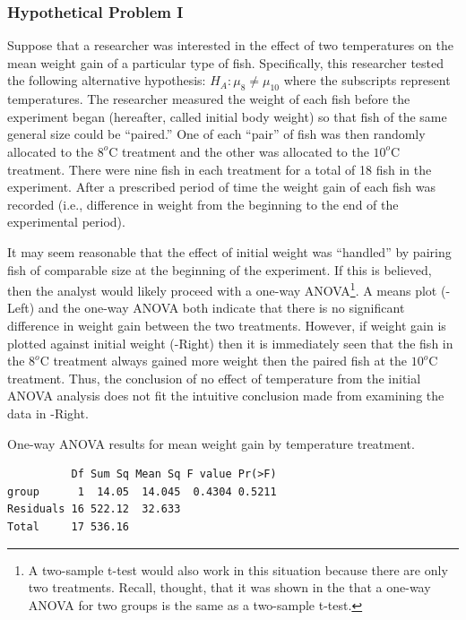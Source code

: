 \documentclass[10pt,openany]{book}\usepackage[]{graphicx}\usepackage[]{color}
\makeatletter
\newenvironment{kframe}{%
 \def\at@end@of@kframe{}%
 \ifinner\ifhmode%
  \def\at@end@of@kframe{\end{minipage}}%
  \begin{minipage}{\columnwidth}%
 \fi\fi%
 \def\FrameCommand##1{\hskip\@totalleftmargin \hskip-\fboxsep
 \colorbox{shadecolor}{##1}\hskip-\fboxsep
     \hskip-\linewidth \hskip-\@totalleftmargin \hskip\columnwidth}%
 \MakeFramed {\advance\hsize-\width
   \@totalleftmargin\z@ \linewidth\hsize
   \@setminipage}}%
 {\par\unskip\endMakeFramed%
 \at@end@of@kframe}
\newenvironment{knitrout}{}{} %
\makeatother
\begin{document}
\subsubsection*{Hypothetical Problem I}
Suppose that a researcher was interested in the effect of two temperatures on the mean weight gain of a particular type of fish.  Specifically, this researcher tested the following alternative hypothesis: $H_{A}: \mu_{8}\neq\mu_{10}$ where the subscripts represent temperatures.  The researcher measured the weight of each fish before the experiment began (hereafter, called initial body weight) so that fish of the same general size could be ``paired.''  One of each ``pair'' of fish was then randomly allocated to the $8^{o}$C treatment and the other was allocated to the $10^{o}$C treatment.  There were nine fish in each treatment for a total of 18 fish in the experiment.  After a prescribed period of time the weight gain of each fish was recorded (i.e., difference in weight from the beginning to the end of the experimental period).

It may seem reasonable that the effect of initial weight was ``handled'' by pairing fish of comparable size at the beginning of the experiment.  If this is believed, then the analyst would likely proceed with a one-way ANOVA\footnote{A two-sample t-test would also work in this situation because there are only two treatments.  Recall, thought, that it was shown in the  that a one-way ANOVA for two groups is the same as a two-sample t-test.}.  A means plot (-Left) and the one-way ANOVA  both indicate that there is no significant difference in weight gain between the two treatments.  However, if weight gain is plotted against initial weight (-Right) then it is immediately seen that the fish in the $8^{o}$C treatment always gained more weight then the paired fish at the $10^{o}$C treatment.  Thus, the conclusion of no effect of temperature from the initial ANOVA analysis does not fit the intuitive conclusion made from examining the data in -Right.

\begin{table}[h]
  \centering
  \caption{One-way ANOVA results for mean weight gain by temperature treatment.}\label{tab:IVRANCOVAEx1Res1}
\begin{knitrout}
\color{fgcolor}\begin{kframe}
\begin{verbatim}
          Df Sum Sq Mean Sq F value Pr(>F)
group      1  14.05  14.045  0.4304 0.5211
Residuals 16 522.12  32.633               
Total     17 536.16                       
\end{verbatim}
\end{kframe}
\end{knitrout}
\end{table}
\end{document}
